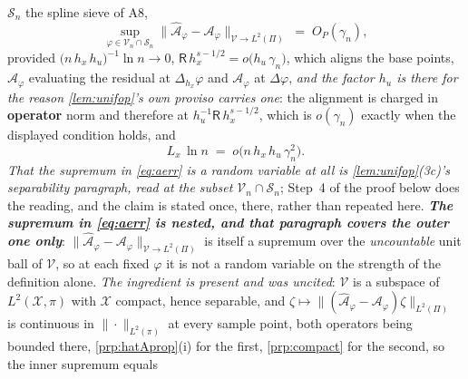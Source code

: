 \begin{lemma}
$\mathcal S_n$ the spline sieve of A8,
\begin{equation}\label{eq:aerr}
\sup_{\varphi\in\mathcal V_n\cap\mathcal S_n}\big\|\hat{\mathcal A}_\varphi-\mathcal A_\varphi\big\|_{\mathcal V\to L^{2}(\Pi)}
\;=\;O_P(\gamma_n),
\end{equation}
provided $\big(n\,h_x\,h_u\big)^{-1}\ln n\to0$, $\mathsf R\,h_x^{s-1/2}=o\big(h_u\,\gamma_n\big)$, 
which aligns the base points, $\hat{\mathcal A}_\varphi$ evaluating the residual at
$\Delta_{h_x}\varphi$ and $\mathcal A_\varphi$ at $\Delta\varphi$, \emph{and the factor $h_u$ is there for
the reason \cref{lem:unifop}'s own proviso carries one}: the alignment is charged in \textbf{operator}
norm and therefore at $h_u^{-1}\mathsf R\,h_x^{s-1/2}$, which is $o(\gamma_n)$ exactly when the displayed
condition holds, and
\begin{equation}\label{eq:entropyA}
L_x\,\ln n\;=\;o\big(n\,h_x\,h_u\,\gamma_n^{2}\big) .
\end{equation}
\emph{That the supremum in \eqref{eq:aerr} is a random variable at all is \cref{lem:unifop}\textup{(3c)}'s
separability paragraph, read at the subset $\mathcal V_n\cap\mathcal S_n$}; Step~4 of the proof below does the
reading, and the claim is stated once, there, rather than repeated here.
\emph{\textbf{The supremum in \eqref{eq:aerr} is nested, and that paragraph covers the outer one only}}:
$\|\hat{\mathcal A}_\varphi-\mathcal A_\varphi\|_{\mathcal V\to L^{2}(\Pi)}$ is itself a supremum over the
\emph{uncountable} unit ball of $\mathcal V$, so at each fixed $\varphi$ it is not a random variable on the
strength of the definition alone. \emph{The ingredient is present and was uncited}: $\mathcal V$ is a
subspace of $L^{2}(\mathcal X,\pi)$ with $\mathcal X$ compact, hence separable, and
$\zeta\mapsto\|(\hat{\mathcal A}_\varphi-\mathcal A_\varphi)\zeta\|_{L^{2}(\Pi)}$ is continuous in
$\|\cdot\|_{L^{2}(\pi)}$ at every sample point, both operators being bounded there, 
\cref{prp:hatAprop}(i) for the first, \cref{prp:compact} for the second, so the inner supremum equals

\end{lemma}
